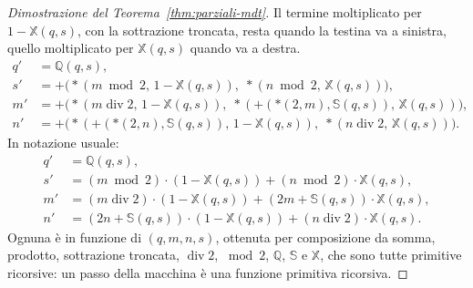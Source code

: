 \documentclass[a4paper, 11pt, oneside]{book}
\theoremstyle{formale}
\begin{document}
\begin{proof}[Dimostrazione del Teorema~\ref{thm:parziali-mdt}]
        Il termine moltiplicato per $1 - \mathbb{X}(q, s)$, con la sottrazione troncata,
        resta quando la testina va a sinistra, quello moltiplicato per $\mathbb{X}(q, s)$
        quando va a destra.
        \begin{align*}
            q' &= \mathbb{Q}(q, s), \\
            s' &= {+}\bigl({*}(m \bmod 2,\, 1 - \mathbb{X}(q, s)),\;
                {*}(n \bmod 2,\, \mathbb{X}(q, s))\bigr), \\
            m' &= {+}\bigl({*}(m \operatorname{div} 2,\, 1 - \mathbb{X}(q, s)),\;
                {*}({+}({*}(2, m), \mathbb{S}(q, s)),\, \mathbb{X}(q, s))\bigr), \\
            n' &= {+}\bigl({*}({+}({*}(2, n), \mathbb{S}(q, s)),\, 1 - \mathbb{X}(q, s)),\;
                {*}(n \operatorname{div} 2,\, \mathbb{X}(q, s))\bigr).
        \end{align*}
        In notazione usuale:
        \begin{align*}
            q' &= \mathbb{Q}(q, s), \\
            s' &= (m \bmod 2) \cdot (1 - \mathbb{X}(q, s))
                + (n \bmod 2) \cdot \mathbb{X}(q, s), \\
            m' &= (m \operatorname{div} 2) \cdot (1 - \mathbb{X}(q, s))
                + (2m + \mathbb{S}(q, s)) \cdot \mathbb{X}(q, s), \\
            n' &= (2n + \mathbb{S}(q, s)) \cdot (1 - \mathbb{X}(q, s))
                + (n \operatorname{div} 2) \cdot \mathbb{X}(q, s).
        \end{align*}
        Ognuna \`e in funzione di $(q, m, n, s)$, ottenuta per composizione da somma,
        prodotto, sottrazione troncata, $\operatorname{div} 2$, $\bmod 2$, $\mathbb{Q}$,
        $\mathbb{S}$ e $\mathbb{X}$, che sono tutte primitive ricorsive: un passo della
        macchina \`e una funzione primitiva ricorsiva.


\end{proof}
\end{document}
